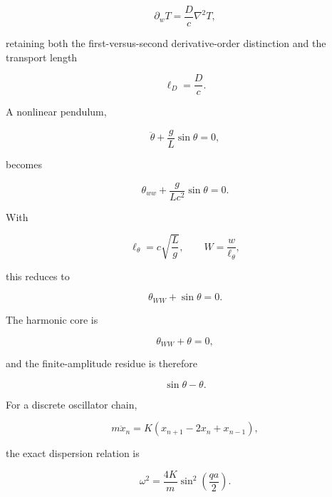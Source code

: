 \documentclass[10pt]{article}
\newcommand{\lap}{\nabla^2}
\begin{document}
\begin{equation}
  \partial_w T
  =
  \frac{D}{c}\lap T ,
  \label{eq:diff}
\end{equation}

retaining both the first-versus-second derivative-order distinction
and the transport length

\begin{equation}
  \ell_D=\frac{D}{c}.
\end{equation}

A nonlinear pendulum,

\begin{equation}
  \ddot\theta+\frac{g}{L}\sin\theta=0 ,
\end{equation}

becomes

\begin{equation}
  \theta_{ww}
  +
  \frac{g}{Lc^2}\sin\theta
  =
  0 .
\end{equation}

With

\begin{equation}
  \ell_\theta=c\sqrt{\frac{L}{g}},
  \qquad
  W=\frac{w}{\ell_\theta},
\end{equation}

this reduces to

\begin{equation}
  \theta_{WW}+\sin\theta=0 .
\end{equation}

The harmonic core is

\begin{equation}
  \theta_{WW}+\theta=0 ,
\end{equation}

and the finite-amplitude residue is therefore

\begin{equation}
  \sin\theta-\theta .
\end{equation}

For a discrete oscillator chain,

\begin{equation}
  m\ddot x_n
  =
  K(x_{n+1}-2x_n+x_{n-1}),
\end{equation}

the exact dispersion relation is

\begin{equation}
  \omega^2
  =
  \frac{4K}{m}
  \sin^2\!\left(\frac{qa}{2}\right).
\end{equation}
\end{document}
